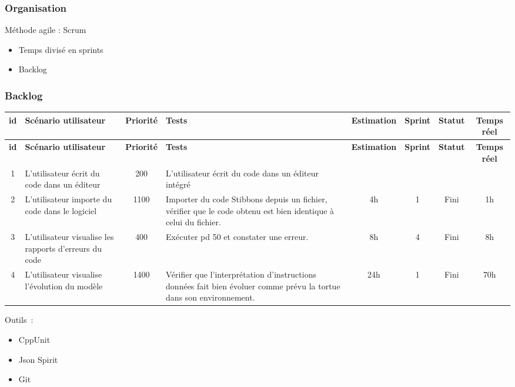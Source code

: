 \begin{frame}
\frametitle{Organisation}
Méthode agile : Scrum
\begin{itemize}
\item Temps divisé en sprints
\item Backlog
\end{itemize}
\end{frame}


\begin{frame}
\frametitle{Backlog}
{\tiny
\begin{longtable}[c]{|c|p{1cm}|c|p{1.7cm}|*{4}{c|}}
\hline
\bf id & \bf Scénario utilisateur & \bf Priorité & \bf Tests & \bf Estimation & \bf Sprint & \bf Statut & \bf Temps réel \\
\hline
\endfirsthead
\hline
\bf id & \bf Scénario utilisateur & \bf Priorité & \bf Tests & \bf Estimation & \bf Sprint & \bf Statut & \bf Temps réel \\
\hline
\endhead
1 & L'utilisateur écrit du code dans un éditeur & 200 & L'utilisateur écrit du code dans un éditeur intégré & & & & \\
\hline
2 & L'utilisateur importe du code dans le logiciel & 1100 & Importer du code Stibbons depuis un fichier, vérifier que le code obtenu est bien identique à celui du fichier. & 4h & 1 & Fini & 1h \\
\hline
3 & L'utilisateur visualise les rapports d'erreurs du code & 400 & Exécuter pd 50 et constater une erreur. & 8h & 4 & Fini & 8h \\
\hline
4 & L'utilisateur visualise l'évolution du modèle & 1400 & Vérifier que l'interprétation d'instructions données fait bien évoluer comme prévu la tortue dans son environnement. & 24h & 1 & Fini & 70h \\
\hline
\end{longtable}}
\end{frame}

\begin{frame}
Outils~:
\begin{itemize}
\item CppUnit
\item Json Spirit
\item Git
\end{itemize}
\end{frame}
